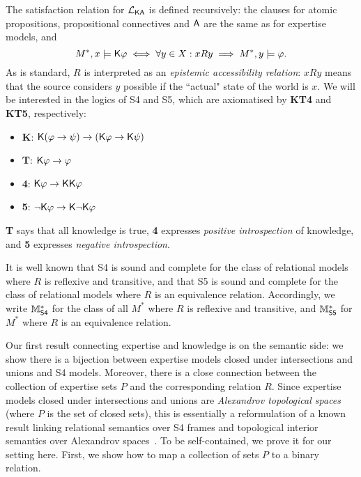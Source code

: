 The satisfaction relation for $\mathcal{L}_{\mathsf{K}\mathsf{A}}$ is defined recursively: the clauses
for atomic propositions, propositional connectives and $\mathsf{A}$ are the same
as for expertise models, and
\[
    M^*, x \models \mathsf{K}\varphi
    \iff
    \forall y \in X: xRy \implies M^*, y \models \varphi.
\]
As is standard, $R$ is interpreted as an \emph{epistemic accessibility relation}:
$xRy$ means that the source considers $y$ possible if the ``actual"
state of the world is $x$. We will be interested in the logics of S4 and
S5, which are axiomatised by \textbf{KT4} and \textbf{KT5}, respectively:

\begin{itemize}
    \item \textbf{K}: $\mathsf{K}(\varphi \to \psi) \to (\mathsf{K}\varphi \to
          \mathsf{K}\psi)$

    \item \textbf{T}: $\mathsf{K}\varphi \to \varphi$

    \item \textbf{4}: $\mathsf{K}\varphi \to \mathsf{K}\mathsf{K}\varphi$

    \item \textbf{5}: $\neg\mathsf{K}\varphi \to \mathsf{K}\neg\mathsf{K}\varphi$

\end{itemize}

\textbf{T} says that all knowledge is true, \textbf{4} expresses \emph{positive
introspection} of knowledge, and \textbf{5} expresses \emph{negative
introspection}.

It is well known that S4 is sound and complete for the class of relational
models where $R$ is reflexive and transitive, and that S5 is sound and complete
for the class of relational models where $R$ is an equivalence relation.
Accordingly, we write $\mathbb{M}^*_{\mathsf{S4}}$ for the class of all $M^*$ where $R$ is
reflexive and transitive, and $\mathbb{M}^*_{\mathsf{S5}}$ for $M^*$ where $R$ is an equivalence
relation.

Our first result connecting expertise and knowledge is on the semantic side: we
show there is a bijection between expertise models closed under intersections
and unions and S4 models. Moreover, there is a close connection between the
collection of expertise sets $P$ and the corresponding relation $R$.
Since expertise models closed under intersections and unions
are \emph{Alexandrov topological spaces} (where $P$ is the set of closed sets),
this is essentially a reformulation of a known result linking relational
semantics over S4 frames and topological interior semantics over Alexandrov
spaces~\citep{van2007modal,ozgun_evidence}.\footnotemark{} To be self-contained,
we prove it for our setting here. First, we show how to map a collection of
sets $P$ to a binary relation.

